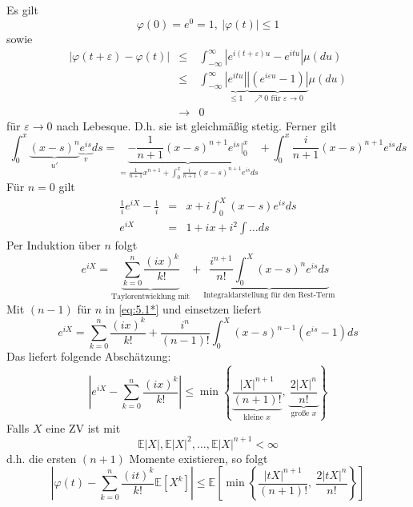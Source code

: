 \documentclass[10pt,a4paper]{report}
\numberwithin{equation}{section}
\numberwithin{figure}{section}
\theoremstyle{plain}
\theoremstyle{definition}
\theoremstyle{plain}
\theoremstyle{definition}
\theoremstyle{remark}
\theoremstyle{plain}
\theoremstyle{plain}
\theoremstyle{plain}
\theoremstyle{plain}
\theoremstyle{plain}
\newcommand{\1}{ \mathbb{1} } %
\begin{document}
Es gilt
\[
\varphi\left(0\right)=e^{0}=1,\ \left|\varphi\left(t\right)\right|\leq1
\]
sowie 
\begin{eqnarray*}
\left|\varphi\left(t+\varepsilon\right)-\varphi\left(t\right)\right| & \leq & \int_{-\infty}^{\infty}\left|e^{i\left(t+\varepsilon\right)u}-e^{itu}\right|\mu\left(du\right)\\
 & \leq & \int_{-\infty}^{\infty}\underset{\leq1}{\underbrace{\left|e^{itu}\right|}}\underset{\nearrow0\text{ für }\varepsilon\to0}{\underbrace{\left|\left(e^{i\varepsilon u}-1\right)\right|}}\mu\left(du\right)\\
 & \to & 0
\end{eqnarray*}
für $\varepsilon\to0$ nach Lebesque. D.h. sie ist gleichmäßig stetig.
Ferner gilt 
\begin{equation}
\int_{0}^{x}\underset{u'}{\underbrace{\left(x-s\right)^{n}}}\underset{v}{\underbrace{e^{is}}}ds=\underset{=\frac{1}{n+1}x^{n+1}+\int_{0}^{x}\frac{i}{n+1}\left(x-s\right)^{n+1}e^{is}ds}{\underbrace{-\frac{1}{n+1}\left(x-s\right)^{n+1}e^{is}|_{0}^{x}}}+\int_{0}^{x}\frac{i}{n+1}\left(x-s\right)^{n+1}e^{is}ds\label{eq:5.1*}
\end{equation}
Für $n=0$ gilt
\begin{eqnarray*}
\frac{1}{i}e^{iX}-\frac{1}{i} & = & x+i\int_{0}^{X}\left(x-s\right)e^{is}ds\\
e^{iX} & = & 1+ix+i^{2}\int\ldots ds
\end{eqnarray*}
Per Induktion über $n$ folgt
\[
e^{iX}=\underset{\mbox{Taylorentwicklung mit}}{\underbrace{\sum_{k=0}^{n}\frac{\left(ix\right)^{k}}{k!}}}+\underset{\mbox{Integraldarstellung für den Rest-Term}}{\underbrace{\frac{i^{n+1}}{n!}\int_{0}^{X}\left(x-s\right)^{n}e^{is}ds}}
\]
Mit $\left(n-1\right)$ für $n$ in \ref{eq:5.1*} und einsetzen liefert
\[
e^{iX}=\sum_{k=0}^{n}\frac{\left(ix\right)^{k}}{k!}+\frac{i^{n}}{\left(n-1\right)!}\int_{0}^{X}\left(x-s\right)^{n-1}\left(e^{is}-1\right)ds
\]
Das liefert folgende Abschätzung:
\[
\left|e^{iX}-\sum_{k=0}^{n}\frac{\left(ix\right)^{k}}{k!}\right|\leq\min\left\{ \underset{\mbox{kleine }x}{\underbrace{\frac{\left|X\right|^{n+1}}{\left(n+1\right)!}}},\ \underset{\mbox{große }x}{\underbrace{\frac{2\left|X\right|^{n}}{n!}}}\right\} 
\]
Falls $X$ eine ZV ist mit 
\[
\mathbb{E}\left|X\right|,\mathbb{E}\left|X\right|^{2},\ldots,\mathbb{E}\left|X\right|^{n+1}<\infty
\]
d.h. die ersten $\left(n+1\right)$ Momente existieren, so folgt
\[
\left|\varphi\left(t\right)-\sum_{k=0}^{n}\frac{\left(it\right)^{k}}{k!}\mathbb{E}\left[X^{k}\right]\right|\leq\mathbb{E}\left[\min\left\{ \frac{\left|tX\right|^{n+1}}{\left(n+1\right)!},\ \frac{2\left|tX\right|^{n}}{n!}\right\} \right]
\]
\end{document}
